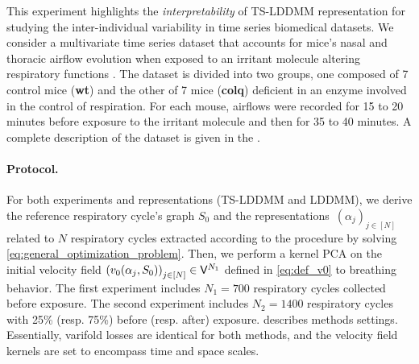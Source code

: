 
This experiment highlights the \textit{interpretability} of TS-LDDMM representation for studying the inter-individual variability in time series biomedical datasets. We consider a multivariate time series dataset that accounts for mice's nasal and thoracic airflow evolution when exposed to an irritant molecule altering respiratory functions \cite{nervo2019respiratory}.
The dataset is divided into two groups, one composed of 7 control mice (\textbf{wt}) and the other of 7 mice (\textbf{colq}) deficient in an enzyme involved in the control of respiration. For each mouse, airflows were recorded for 15 to 20 minutes before exposure to the irritant molecule and then for 35 to 40 minutes. A complete 
description of the dataset is given in the .

\paragraph{Protocol.} For both experiments and representations (TS-LDDMM and LDDMM), we derive the reference respiratory cycle's graph $S_0$ and the representations $(\alpha_j)_{j\in[N]}$ related to $N$ respiratory cycles extracted according to the procedure \cite{germain2023unsupervised} by solving  \eqref{eq:general_optimization_problem}.
 Then, we perform a kernel PCA on the initial velocity field $\left(v_0(\alpha_j,S_0)\right)_{j\in[N]}\in \mathsf{V}^{N_1}$ defined in \eqref{eq:def_v0} to breathing behavior.
  The first experiment includes $N_1 = 700$ respiratory cycles collected before exposure. The second experiment includes $N_2 = 1400$ respiratory cycles with 25\% (resp. 75\%) before (resp. after) exposure.
    describes methods settings.
    Essentially, varifold losses are identical for both methods, and the velocity field kernels are set to encompass time and space scales. 

